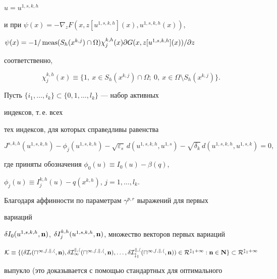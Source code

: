 \begin{lems}
$u=u^{1,s,k,h}$ 


и при $\psi(x)=-\nabla_z F(x,z[u^{1,s,k,h}](x),u^{1,s,k,h}(x))$, 


$\psi(x)=-1/\meas(S_h(x^{k,j})\cap\Omega)\chi^{k,h}_j(x)\partial 


G(x,z[u^{1,s,k,h}](x))/\partial z$ 


соответственно, 


$$ 


\chi^{k,h}_j(x)\equiv\{1,\ x\in S_h(x^{k,j})\cap\Omega; 


\ 0,\ x\in\Omega\setminus S_h(x^{k,j})\}. 


$$ 


\end{lems} 


 


Пусть $\{i_1,\dotsc,i_k\}\subset\{0,1,\dotsc,l_k\}$ --- набор активных 


индексов, т.\,е. всех 


тех индексов, для которых справедливы равенства 


$$ 


J^{s,k,h}(u^{1,s,k,h})-\phi_j(u^{1,s,k,h})- 


\sqrt{\varepsilon_s}\,d(u^{1,s,k,h},u^{1,s})- 


\sqrt{\delta_k}\,d(u^{1,s,k,h},u^{1,s,k})=0, 


$$ 


где приняты обозначения $\phi_0(u)\equiv I_0(u)-\beta(q)$, 


$\phi_j(u)\equiv I^{k,h}_j(u)-q(x^{k,h})$, $j=1,\dotsc,l_k$. 


 


Благодаря аффинности по параметрам $\gamma^{p,r}$ выражений для первых 


вариаций 


$\delta I_0(u^{1,s,k,h},\bold n)$, $\delta I^{k,h}_j(u^{1,s,k,h},\bold 


n)$, множество векторов первых вариаций 


$\cal K\equiv\{(\delta I_0(u^{1,s,k,h},\bold n),\delta 


I^{k,h}_1(u^{1,s,k,h},\bold n),\dotsc,\linebreak


\delta I^{k,h}_{l_k}(u^{1,s,k,h}, 


\bold n))\in R^{l_k+1}:\bold n\in\bold N\}\subset R^{l_k+1}$ 


выпукло (это доказывается с помощью стандартных для оптимального 



